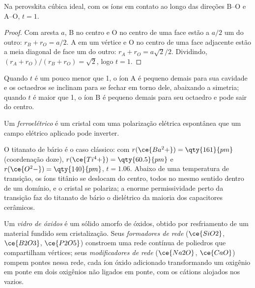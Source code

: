 \begin{proposition}\label{prop:b3:inorganic-materials:tolerance}
Na perovskita cúbica ideal, com os íons em contato ao longo das direções B--O e A--O,
$t = 1$.
\end{proposition}

\begin{proof}
Com aresta $a$, B no centro e O no centro de uma face estão a $a/2$ um do outro: $r_B + r_O = a/2$.
A em um vértice e O no centro de uma face adjacente estão a meia diagonal de face
um do outro: $r_A + r_O = a\sqrt2/2$. Dividindo, $(r_A + r_O)/(r_B + r_O) = \sqrt2$, logo $t = 1$.
\end{proof}

Quando $t$ é um pouco menor que 1, o íon A é pequeno demais para sua cavidade e os
octaedros se inclinam para se fechar em torno dele, abaixando a simetria; quando $t$ é maior que 1,
o íon B é pequeno demais para seu octaedro e pode sair do centro.

\begin{definition}[Ferroelétrico]\label{def:b3:inorganic-materials:ferroelectric}
Um \emph{ferroelétrico} é um cristal com uma polarização
elétrica espontânea que um campo elétrico aplicado pode inverter.
\end{definition}

O titanato de bário é o caso clássico: com $r(\ce{Ba^2+}) = \qty{161}{pm}$ (coordenação doze),
$r(\ce{Ti^4+}) = \qty{60.5}{pm}$ e $r(\ce{O^2-}) = \qty{140}{pm}$, $t = 1.06$. Abaixo de uma temperatura de transição, os
íons titânio se deslocam do centro, todos no mesmo sentido dentro de um domínio,
e o cristal se polariza; a enorme permissividade perto da transição faz do
titanato de bário o dielétrico da maioria dos capacitores cerâmicos.

\begin{definition}\label{def:b3:inorganic-materials:glass}
Um \emph{vidro de óxidos} é um sólido amorfo de óxidos, obtido por
resfriamento de um material fundido sem cristalização. Seus \emph{formadores de
rede} ($\ce{SiO2}$, $\ce{B2O3}$, $\ce{P2O5}$) constroem uma rede contínua de
poliedros que compartilham vértices; seus \emph{modificadores de rede}
($\ce{Na2O}$, $\ce{CaO}$) rompem pontes nessa rede, cada íon óxido adicionado transformando um
oxigênio em ponte em dois oxigênios não ligados em ponte, com os cátions alojados nos
vazios.
\end{definition}

